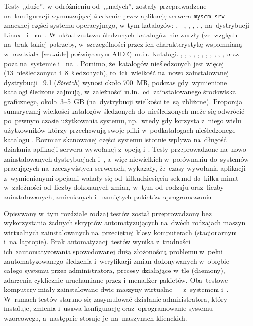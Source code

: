\documentclass[thesis]{subfiles}
\begin{document}
Testy ,,duże'', w~odróżnieniu od~,,małych'', zostały przeprowadzone na~konfiguracji wymuszającej śledzenie przez aplikację serwera \texttt{myscm-srv} znacznej części systemu operacyjnego, w~tym katalogów: , , , , , , ,  na~dystrybucji Linux~\debian{} i~ na~\linuxarch. W~skład zestawu śledzonych katalogów nie weszły (ze~względu na~brak takiej potrzeby, w~szczególności przez ich charakterystykę wspomnianą w~rozdziale~\ref{sec:aide} poświęconym AIDE) m.in.~katalogi: , , , , , , , , , , ,  oraz~ poza  na~systemie \debian{} i~ na~\linuxarch{}. Pomimo, że~katalogów nieśledzonych jest więcej (13~nieśledzonych i~8~śledzonych), to~ich~wielkość na~nowo zainstalowanej dystrybucji \debian{}~9.1 (\emph{Stretch}) wynosi około 700~MB, podczas gdy~wymienione katalogi śledzone zajmują, w~zależności m.in.~od~zainstalowanego środowiska graficznego, około~3--5~GB (na~dystrybucji \linuxarch{} wielkości te~są~zbliżone). Proporcja sumarycznej wielkości katalogów śledzonych do~nieśledzonych może się odwrócić po~pewnym czasie użytkowania systemu, np.~wtedy gdy korzysta z~niego wielu użytkowników którzy przechowują swoje pliki w~podkatalogach nieśledzonego katalogu . Rozmiar skanowanej części systemu istotnie wpływa na~długość działania aplikacji serwera \texttt{\srvappname{}} wywołanej z~opcją  i~. Testy przeprowadzone na~nowo zainstalowanych dystrybucjach \debian{} i~\arch{}, a~więc niewielkich w~porównaniu do~systemów pracujących na~rzeczywistych serwerach, wykazały, że~czasy wywołania aplikacji z~wymienionymi opcjami wahały się od~kilkudziesięciu sekund do~kilku minut w~zależności od~liczby dokonanych zmian, w~tym od~rodzaju oraz~liczby zainstalowanych, zmienionych i~usuniętych pakietów oprogramowania.

Opisywany w~tym rozdziale rodzaj testów został przeprowadzony bez wykorzystania żadnych skryptów automatyzujących na~dwóch rodzajach maszyn wirtualnych zainstalowanych na~przeciętnej klasy komputerach (stacjonarnym i~na~laptopie). Brak automatyzacji testów wynika z~trudności ich~zautomatyzowania spowodowanej dużą złożonością problemu w~pełni zautomatyzowanego śledzenia i~weryfikacji zmian dokonywanych w~obrębie całego systemu przez administratora, procesy działające w~tle (daemony), zdarzenia cyklicznie uruchamiane przez  i~menadżer pakietów. Oba~testowe komputery miały zainstalowane dwie maszyny wirtualne --- z~systemem \debian{} i~\linuxarch{}. W~ramach testów starano się zasymulować działanie administratora, który instaluje, zmienia i~usuwa konfigurację oraz~oprogramowanie systemu wzorcowego, a~następnie stosuje je~na~maszynach klienckich.
\end{document}

